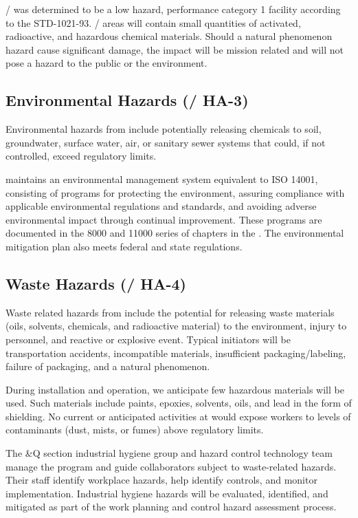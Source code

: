 / was determined to be a low hazard,
performance category 1 facility according to the 
STD-1021-93. / areas will contain small
quantities of activated, radioactive, and hazardous chemical
materials. Should a natural phenomenon hazard cause significant
damage, the impact will be mission related and will not pose a hazard
to the public or the environment.

\subsection{Environmental Hazards (/ HA-3)}

Environmental hazards from  include potentially releasing
chemicals to soil, groundwater, surface water, air, or sanitary sewer
systems that could, if not controlled, exceed regulatory limits.

\fnal maintains an environmental management system equivalent to ISO
14001, consisting of programs for protecting the environment, assuring
compliance with applicable environmental regulations and standards,
and avoiding adverse environmental impact through continual
improvement.  These programs are documented in the 8000 and 11000
series of chapters in the .  The environmental mitigation
plan also meets federal and state regulations.


\subsection{Waste Hazards (/ HA-4)}

Waste related hazards from  include the potential for
releasing waste materials (oils, solvents, chemicals, and radioactive
material) to the environment, injury to personnel, and reactive or
explosive event. Typical initiators will be transportation accidents,
incompatible materials, insufficient packaging/labeling, failure of
packaging, and a natural phenomenon.

During installation and  operation, we anticipate few
hazardous materials will be used. Such materials include paints,
epoxies, solvents, oils, and lead in the form of shielding. No current
or anticipated activities at  would expose workers to
levels of contaminants (dust, mists, or fumes) above regulatory
limits.

The \&Q section industrial hygiene group and hazard control
technology team manage the program and guide collaborators subject to
waste-related hazards.  Their staff identify workplace hazards, help
identify controls, and monitor implementation. Industrial hygiene
hazards will be evaluated, identified, and mitigated as part of the
work planning and control hazard assessment process.

